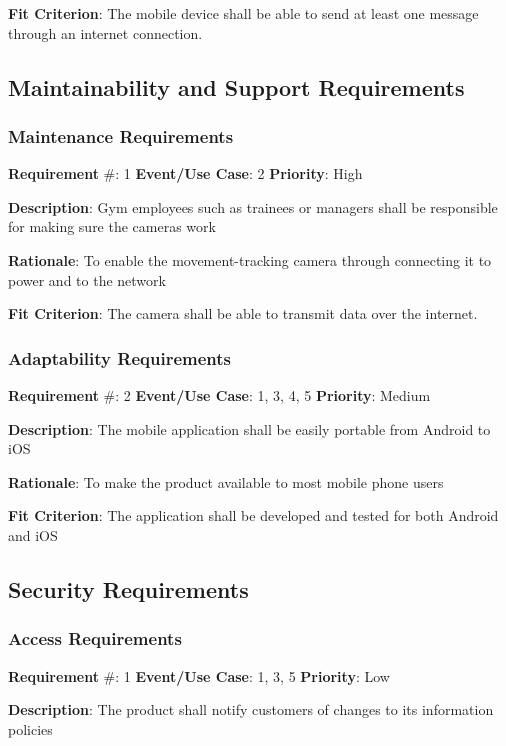 \documentclass{article}
\newcommand\tab{\hspace*{2cm}}
\begin{document}
\textbf{Fit Criterion}: The mobile device shall be able to send at least one message through an internet connection.

\medskip


\subsection{Maintainability and Support Requirements}
\subsubsection{Maintenance Requirements}
\textbf{Requirement} \#: 1 \tab \textbf{Event/Use Case}: 2 \tab \textbf{Priority}: High

\textbf{Description}: Gym employees such as trainees or managers shall be responsible for making sure the cameras work

\textbf{Rationale}: To enable the movement-tracking camera through connecting it to power and to the network

\textbf{Fit Criterion}: The camera shall be able to transmit data over the internet.

\medskip


\subsubsection{Adaptability Requirements}

\textbf{Requirement} \#: 2 \tab \textbf{Event/Use Case}: 1, 3, 4, 5 \tab \textbf{Priority}: Medium

\textbf{Description}: The mobile application shall be easily portable from Android to iOS

\textbf{Rationale}: To make the product available to most mobile phone users

\textbf{Fit Criterion}: The application shall be developed and tested for both Android and iOS

\medskip

\subsection{Security Requirements}
\subsubsection{Access Requirements}
\textbf{Requirement} \#: 1 \tab \textbf{Event/Use Case}: 1, 3, 5 \tab \textbf{Priority}: Low

\textbf{Description}: The product shall notify customers of changes to its information policies
\end{document}
